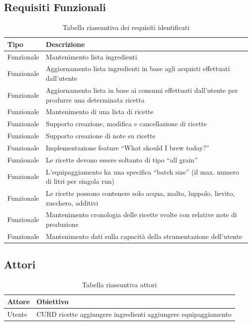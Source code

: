 \documentclass[12pt]{article}
\begin{document}
\subsection{Requisiti Funzionali}

\begin{table}[H]
\centering
\begin{tabular}{l|p{10cm}}
Tipo & Descrizione \\
\hline\hline
Funzionale & Mantenimento lista ingredienti \\\hline
Funzionale & Aggiornamento lista ingredienti in base agli acquisti effettuati dall’utente \\\hline
Funzionale & Aggiornamento lista in base ai consumi effettuati dall’utente per produrre una determinata ricetta \\\hline
Funzionale & Mantenimento di una lista di ricette \\\hline
Funzionale & Supporto creazione, modifica e cancellazione di ricette \\\hline
Funzionale & Supporto creazione di note su ricette \\\hline
Funzionale & Implementazione feature “What should I brew today?” \\\hline
Funzionale & Le ricette devono essere soltanto di tipo “all grain” \\\hline
Funzionale & L’equipaggiamento ha una specifica “batch size” (il max. numero di litri per singola run) \\\hline
Funzionale & Le ricette possono contenere solo acqua, malto, luppolo, lievito, zucchero, additivi\\ \hline
Funzionale & Mantenimento cronologia delle ricette svolte con relative note di produzione \\\hline
Funzionale & Mantenimento dati sulla capacità della strumentazione dell’utente \\
\end{tabular}
\caption{\label{tab:tabella_requisiti}Tabella riassuntiva dei requisiti identificati}
\end{table}


\subsection{Attori}

\begin{table}[H]
\centering
\begin{tabular}{l|p{6cm}}
Attore & Obiettivo \\
\hline\hline
Utente & CURD ricette \newline
aggiungere ingredienti \newline
aggiungere equipaggiamento \\
\end{tabular}
\caption{\label{tab:tabella_attori}Tabella riassuntiva attori}
\end{table}
\end{document}

